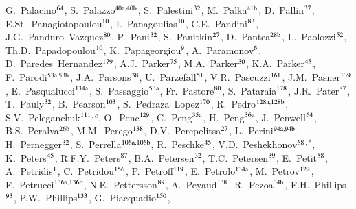 \begin{flushleft}
G.~Palacino$^\textrm{\scriptsize 64}$,
S.~Palazzo$^\textrm{\scriptsize 40a,40b}$,
S.~Palestini$^\textrm{\scriptsize 32}$,
M.~Palka$^\textrm{\scriptsize 41b}$,
D.~Pallin$^\textrm{\scriptsize 37}$,
E.St.~Panagiotopoulou$^\textrm{\scriptsize 10}$,
I.~Panagoulias$^\textrm{\scriptsize 10}$,
C.E.~Pandini$^\textrm{\scriptsize 83}$,
J.G.~Panduro~Vazquez$^\textrm{\scriptsize 80}$,
P.~Pani$^\textrm{\scriptsize 32}$,
S.~Panitkin$^\textrm{\scriptsize 27}$,
D.~Pantea$^\textrm{\scriptsize 28b}$,
L.~Paolozzi$^\textrm{\scriptsize 52}$,
Th.D.~Papadopoulou$^\textrm{\scriptsize 10}$,
K.~Papageorgiou$^\textrm{\scriptsize 9}$,
A.~Paramonov$^\textrm{\scriptsize 6}$,
D.~Paredes~Hernandez$^\textrm{\scriptsize 179}$,
A.J.~Parker$^\textrm{\scriptsize 75}$,
M.A.~Parker$^\textrm{\scriptsize 30}$,
K.A.~Parker$^\textrm{\scriptsize 45}$,
F.~Parodi$^\textrm{\scriptsize 53a,53b}$,
J.A.~Parsons$^\textrm{\scriptsize 38}$,
U.~Parzefall$^\textrm{\scriptsize 51}$,
V.R.~Pascuzzi$^\textrm{\scriptsize 161}$,
J.M.~Pasner$^\textrm{\scriptsize 139}$,
E.~Pasqualucci$^\textrm{\scriptsize 134a}$,
S.~Passaggio$^\textrm{\scriptsize 53a}$,
Fr.~Pastore$^\textrm{\scriptsize 80}$,
S.~Pataraia$^\textrm{\scriptsize 178}$,
J.R.~Pater$^\textrm{\scriptsize 87}$,
T.~Pauly$^\textrm{\scriptsize 32}$,
B.~Pearson$^\textrm{\scriptsize 103}$,
S.~Pedraza~Lopez$^\textrm{\scriptsize 170}$,
R.~Pedro$^\textrm{\scriptsize 128a,128b}$,
S.V.~Peleganchuk$^\textrm{\scriptsize 111}$$^{,c}$,
O.~Penc$^\textrm{\scriptsize 129}$,
C.~Peng$^\textrm{\scriptsize 35a}$,
H.~Peng$^\textrm{\scriptsize 36a}$,
J.~Penwell$^\textrm{\scriptsize 64}$,
B.S.~Peralva$^\textrm{\scriptsize 26b}$,
M.M.~Perego$^\textrm{\scriptsize 138}$,
D.V.~Perepelitsa$^\textrm{\scriptsize 27}$,
L.~Perini$^\textrm{\scriptsize 94a,94b}$,
H.~Pernegger$^\textrm{\scriptsize 32}$,
S.~Perrella$^\textrm{\scriptsize 106a,106b}$,
R.~Peschke$^\textrm{\scriptsize 45}$,
V.D.~Peshekhonov$^\textrm{\scriptsize 68}$$^{,*}$,
K.~Peters$^\textrm{\scriptsize 45}$,
R.F.Y.~Peters$^\textrm{\scriptsize 87}$,
B.A.~Petersen$^\textrm{\scriptsize 32}$,
T.C.~Petersen$^\textrm{\scriptsize 39}$,
E.~Petit$^\textrm{\scriptsize 58}$,
A.~Petridis$^\textrm{\scriptsize 1}$,
C.~Petridou$^\textrm{\scriptsize 156}$,
P.~Petroff$^\textrm{\scriptsize 119}$,
E.~Petrolo$^\textrm{\scriptsize 134a}$,
M.~Petrov$^\textrm{\scriptsize 122}$,
F.~Petrucci$^\textrm{\scriptsize 136a,136b}$,
N.E.~Pettersson$^\textrm{\scriptsize 89}$,
A.~Peyaud$^\textrm{\scriptsize 138}$,
R.~Pezoa$^\textrm{\scriptsize 34b}$,
F.H.~Phillips$^\textrm{\scriptsize 93}$,
P.W.~Phillips$^\textrm{\scriptsize 133}$,
G.~Piacquadio$^\textrm{\scriptsize 150}$,

\end{flushleft}
